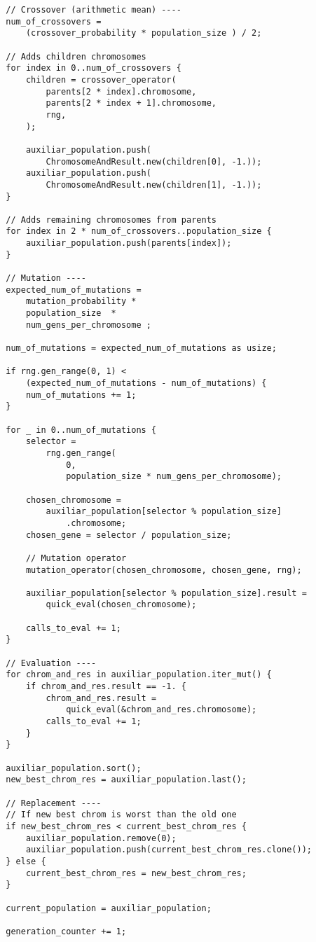 \documentclass[size=a4, parskip=half, titlepage=false, toc=flat, toc=bib, 12pt]{scrartcl}
\begin{document}
\begin{verbatim}
        // Crossover (arithmetic mean) ----
        num_of_crossovers =
            (crossover_probability * population_size ) / 2;

        // Adds children chromosomes
        for index in 0..num_of_crossovers {
            children = crossover_operator(
                parents[2 * index].chromosome,
                parents[2 * index + 1].chromosome,
                rng,
            );

            auxiliar_population.push(
                ChromosomeAndResult.new(children[0], -1.));
            auxiliar_population.push(
                ChromosomeAndResult.new(children[1], -1.));
        }

        // Adds remaining chromosomes from parents
        for index in 2 * num_of_crossovers..population_size {
            auxiliar_population.push(parents[index]);
        }

        // Mutation ----
        expected_num_of_mutations =
            mutation_probability *
            population_size  *
            num_gens_per_chromosome ;

        num_of_mutations = expected_num_of_mutations as usize;

        if rng.gen_range(0, 1) <
            (expected_num_of_mutations - num_of_mutations) {
            num_of_mutations += 1;
        }

        for _ in 0..num_of_mutations {
            selector =
                rng.gen_range(
                    0,
                    population_size * num_gens_per_chromosome);

            chosen_chromosome =
                auxiliar_population[selector % population_size]
                    .chromosome;
            chosen_gene = selector / population_size;

            // Mutation operator
            mutation_operator(chosen_chromosome, chosen_gene, rng);

            auxiliar_population[selector % population_size].result =
                quick_eval(chosen_chromosome);

            calls_to_eval += 1;
        }

        // Evaluation ----
        for chrom_and_res in auxiliar_population.iter_mut() {
            if chrom_and_res.result == -1. {
                chrom_and_res.result =
                    quick_eval(&chrom_and_res.chromosome);
                calls_to_eval += 1;
            }
        }

        auxiliar_population.sort();
        new_best_chrom_res = auxiliar_population.last();

        // Replacement ----
        // If new best chrom is worst than the old one
        if new_best_chrom_res < current_best_chrom_res {
            auxiliar_population.remove(0);
            auxiliar_population.push(current_best_chrom_res.clone());
        } else {
            current_best_chrom_res = new_best_chrom_res;
        }

        current_population = auxiliar_population;

        generation_counter += 1;

\end{verbatim}
\end{document}
